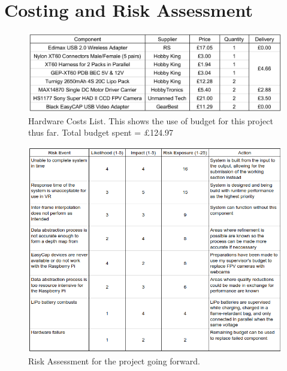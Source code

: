 \chapter{Costing and Risk Assessment}

\begin{figure}[H]
    \begin{center}
      \includegraphics[width=\textwidth]{Figures/Requisitions.png}
      \caption[Hardware Costs List]{Hardware Costs List. This shows the use of budget for this project thus far. Total budget spent = \pounds124.97}
      \label{fig:Costs}
    \end{center}
\end{figure}

\begin{figure}[H]
    \begin{center}
      \includegraphics[width=\textwidth]{Figures/RiskAssessment.png}
      \caption[Risk Assessment]{Risk Assessment for the project going forward.}
      \label{fig:Risk}
    \end{center}
\end{figure}